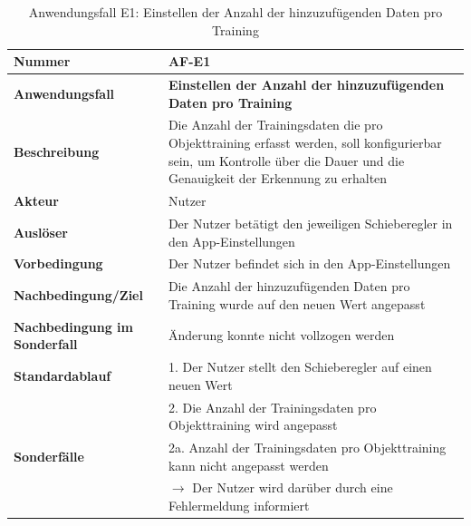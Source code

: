 \documentclass[oneside]{ausarbeitung}
\begin{document}
\begin{table}[htbp]
	\centering
	\begin{tabular}{|l|p{80mm}|}
		\hline
		\textbf{Nummer} & \textbf{AF-E1} \\ \hline
		\textbf{Anwendungsfall} & \textbf{Einstellen der Anzahl der hinzuzufügenden Daten pro Training} \\ \hline
		\textbf{Beschreibung} & Die Anzahl der Trainingsdaten die pro Objekttraining erfasst werden, soll konfigurierbar sein, um Kontrolle über die Dauer und die Genauigkeit der Erkennung zu erhalten \\ \hline
		\textbf{Akteur} & Nutzer \\ \hline
		\textbf{Auslöser} & Der Nutzer betätigt den jeweiligen Schieberegler in den App-Einstellungen \\ \hline
		\textbf{Vorbedingung} & Der Nutzer befindet sich in den App-Einstellungen \\ \hline	
		\textbf{Nachbedingung/Ziel} & Die Anzahl der hinzuzufügenden Daten pro Training wurde auf den neuen Wert angepasst \\ \hline
		\textbf{Nachbedingung im Sonderfall} & Änderung konnte nicht vollzogen werden \\ \hline
		\textbf{Standardablauf} & 1. Der Nutzer stellt den Schieberegler auf einen neuen Wert \\ 
		& 2. Die Anzahl der Trainingsdaten pro Objekttraining wird angepasst \\ \hline
		\textbf{Sonderfälle} & 2a. Anzahl der Trainingsdaten pro Objekttraining kann nicht angepasst werden \\ & $\rightarrow$ Der Nutzer wird darüber durch eine Fehlermeldung informiert \\ \hline
		
	\end{tabular}
	\caption{Anwendungsfall E1: Einstellen der Anzahl der hinzuzufügenden Daten pro Training}
	\label{tab:use-case-set-samples}
\end{table}
\end{document}
